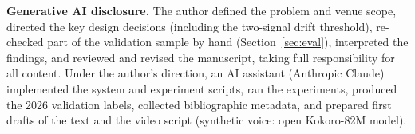 \textbf{Generative AI disclosure.} The author defined the problem and venue scope, directed the key design decisions (including the two-signal drift threshold), re-checked part of the validation sample by hand (Section~\ref{sec:eval}), interpreted the findings, and reviewed and revised the manuscript, taking full responsibility for all content. Under the author's direction, an AI assistant (Anthropic Claude) implemented the system and experiment scripts, ran the experiments, produced the 2026 validation labels, collected bibliographic metadata, and prepared first drafts of the text and the video script (synthetic voice: open Kokoro-82M model).
